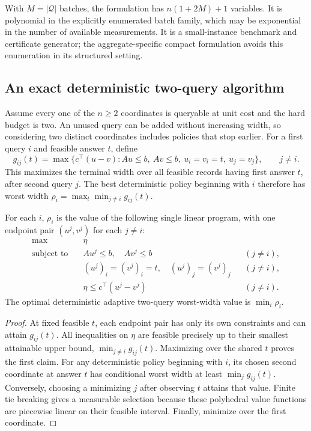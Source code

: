 With $M=|\mathcal Q|$ batches, the formulation has $n(1+2M)+1$ variables.
It is polynomial in the explicitly enumerated batch family, which may be
exponential in the number of available measurements. It is a small-instance
benchmark and certificate generator; the aggregate-specific compact
formulation avoids this enumeration in its structured setting.

\subsection{An exact deterministic two-query algorithm}\label{sec:two-query}
Assume every one of the $n\ge2$ coordinates is queryable at unit cost and the
hard budget is two. An unused query can be added without increasing width,
so considering two distinct coordinates includes policies that stop earlier.
For a first query $i$ and feasible answer $t$, define
\begin{equation}\label{eq:conditional-two-query}
g_{ij}(t)=\max\{c^\top(u-v):Au\le b,\ Av\le b,\
                u_i=v_i=t,\ u_j=v_j\},\qquad j\ne i.
\end{equation}
This maximizes the terminal width over all feasible records having first
answer $t$, after second query $j$. The best deterministic policy beginning
with $i$ therefore has worst width
$\rho_i=\max_t\min_{j\ne i}g_{ij}(t)$.

\begin{proposition}\label{prop:two-query-lp}
For each $i$, $\rho_i$ is the value of the following single linear program,
with one endpoint pair $(u^j,v^j)$ for each $j\ne i$:
\begin{equation}\label{eq:two-query-lp}
\begin{aligned}
\max\quad &\eta\\
\text{subject to}\quad &Au^j\le b,\quad Av^j\le b &&(j\ne i),\\
&(u^j)_i=(v^j)_i=t,\quad (u^j)_j=(v^j)_j &&(j\ne i),\\
&\eta\le c^\top(u^j-v^j) &&(j\ne i).
\end{aligned}
\end{equation}
The optimal deterministic adaptive two-query worst-width value is
$\min_i\rho_i$.
\end{proposition}
\begin{proof}
At fixed feasible $t$, each endpoint pair has only its own constraints and
can attain $g_{ij}(t)$. All inequalities on $\eta$ are feasible precisely up
to their smallest attainable upper bound, $\min_{j\ne i}g_{ij}(t)$.
Maximizing over the shared $t$ proves the first claim.
For any deterministic policy beginning with $i$, its chosen second coordinate
at answer $t$ has conditional worst width at least $\min_jg_{ij}(t)$.
Conversely, choosing a minimizing $j$ after observing $t$ attains that value.
Finite tie breaking gives a measurable selection because these polyhedral
value functions are piecewise linear on their feasible interval. Finally,
minimize over the first coordinate.
\end{proof}

